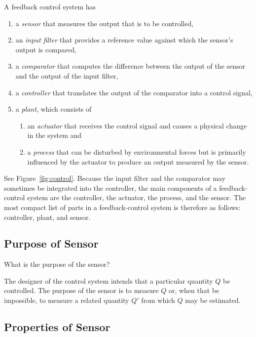 A feedback control system has
\begin{enumerate}
   \item a \emph{sensor} that measures the output that is to be controlled,
   \item an \emph{input filter} that provides a reference value against which
      the sensor's output is compared,
   \item a \emph{comparator} that computes the difference between the output of
      the sensor and the output of the input filter,
   \item a \emph{controller} that translates the output of the comparator into
      a control signal,
   \item a \emph{plant}, which consists of
      \begin{enumerate}
         \item an \emph{actuator} that receives the control signal and causes a
            physical change in the system and
         \item a \emph{process} that can be disturbed by environmental forces
            but is primarily influenced by the actuator to produce an output
            measured by the sensor.
      \end{enumerate}
\end{enumerate}
See Figure~\ref{fig:control}. Because the input filter and the comparator may
sometimes be integrated into the controller, the main components of a
feedback-control system are the controller, the actuator, the process, and the
sensor. The most compact list of parts in a feedback-control system is
therefore as follows: controller, plant, and sensor.

\subsection{Purpose of Sensor}

\begin{prob}
   What is the purpose of the sensor?
\end{prob}

The designer of the control system intends that a particular quantity $Q$ be
controlled. The purpose of the sensor is to measure $Q$ or, when that be
impossible, to measure a related quantity $Q'$ from which $Q$ may be estimated.

\subsection{Properties of Sensor}

